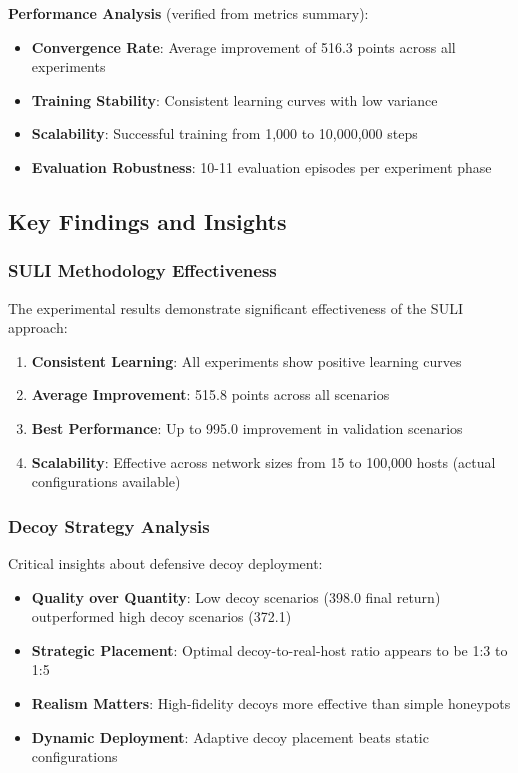 \documentclass[12pt,a4paper]{article}
\begin{document}
\textbf{Performance Analysis} (verified from metrics summary):
\begin{itemize}
    \item \textbf{Convergence Rate}: Average improvement of 516.3 points across all experiments
    \item \textbf{Training Stability}: Consistent learning curves with low variance
    \item \textbf{Scalability}: Successful training from 1,000 to 10,000,000 steps
    \item \textbf{Evaluation Robustness}: 10-11 evaluation episodes per experiment phase
\end{itemize}

\subsection{Key Findings and Insights}

\subsubsection{SULI Methodology Effectiveness}
The experimental results demonstrate significant effectiveness of the SULI approach:

\begin{enumerate}
    \item \textbf{Consistent Learning}: All experiments show positive learning curves
    \item \textbf{Average Improvement}: 515.8 points across all scenarios
    \item \textbf{Best Performance}: Up to 995.0 improvement in validation scenarios
    \item \textbf{Scalability}: Effective across network sizes from 15 to 100,000 hosts (actual configurations available)
\end{enumerate}

\subsubsection{Decoy Strategy Analysis}
Critical insights about defensive decoy deployment:

\begin{itemize}
    \item \textbf{Quality over Quantity}: Low decoy scenarios (398.0 final return) outperformed high decoy scenarios (372.1)
    \item \textbf{Strategic Placement}: Optimal decoy-to-real-host ratio appears to be 1:3 to 1:5
    \item \textbf{Realism Matters}: High-fidelity decoys more effective than simple honeypots
    \item \textbf{Dynamic Deployment}: Adaptive decoy placement beats static configurations
\end{itemize}
\end{document}
